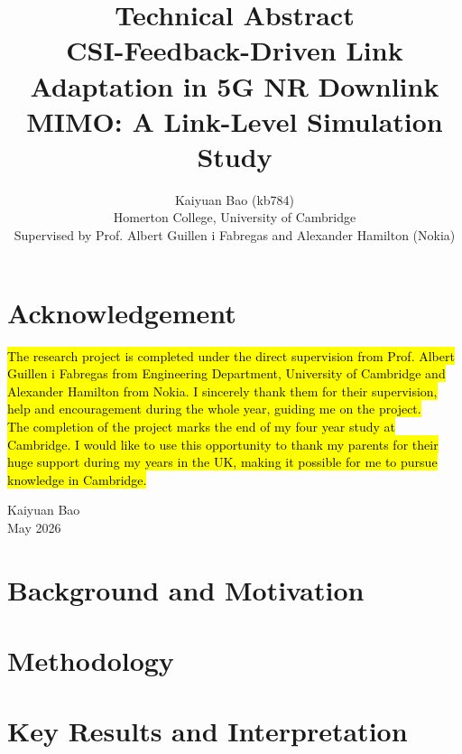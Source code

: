 \documentclass[a4paper,12pt,onecolumn]{article}
\title{\LARGE \bf
	Technical Abstract \\
	CSI-Feedback-Driven Link Adaptation in 5G NR Downlink MIMO: A Link-Level Simulation Study}
\author{
	Kaiyuan Bao (kb784)\\
	Homerton College, University of Cambridge\\[6pt]
	\small Supervised by Prof. Albert Guillen i Fabregas and Alexander Hamilton (Nokia)
}
\begin{document}
	
	
\clearpage

\setcounter{page}{1}
\newpage
\section*{\centering Acknowledgement}
\hl{The research project is completed under the direct supervision from Prof. Albert Guillen i Fabregas from Engineering Department, University of Cambridge and Alexander Hamilton from Nokia. I sincerely thank them for their supervision, help and encouragement during the whole year, guiding me on the project.\\

The completion of the project marks the end of my four year study at Cambridge. I would like to use this opportunity to thank my parents for their huge support during my years in the UK, making it possible for me to pursue knowledge in Cambridge.}

\begin{flushright}
	Kaiyuan Bao \\ May 2026
	\end{flushright}

\newpage



	\maketitle
	\vspace{-35pt}
	\pagestyle{fancy}
	\fancyhead[L]{}   %
	\fancyhead[C]{} 
	\fancyhead[R]{\rightmark}
	\renewcommand{\subsectionmark}[1]{\markright{#1}}  %
	
\thispagestyle{empty}
\section*{Background and Motivation}

\section*{Methodology}

\newpage

\thispagestyle{empty}
\section*{Key Results and Interpretation}
\end{document}

